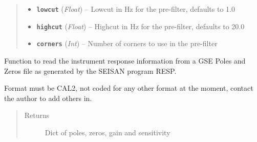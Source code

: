 \documentclass[a4paper,10pt,english]{sphinxmanual}
\begin{document}
\begin{fulllineitems}
\begin{quote}
\begin{description}
\begin{itemize}
\item {} 
\textbf{\texttt{lowcut}} (\emph{Float}) -- Lowcut in Hz for the pre-filter, defaults to 1.0

\item {} 
\textbf{\texttt{highcut}} (\emph{Float}) -- Highcut in Hz for the pre-filter, defaults to 20.0

\item {} 
\textbf{\texttt{corners}} (\emph{Int}) -- Number of corners to use in the pre-filter

\end{itemize}

\end{description}\end{quote}

\end{fulllineitems}


\begin{fulllineitems}
\label{utils:mag_calc._GSE2_PAZ_read}
Function to read the instrument response information from a GSE Poles and
Zeros file as generated by the SEISAN program RESP.

Format must be CAL2, not coded for any other format at the moment, contact
the author to add others in.
\begin{quote}\begin{description}
\item[{Returns}] \leavevmode
Dict of poles, zeros, gain and sensitivity

\end{description}\end{quote}

\end{fulllineitems}

\end{document}
